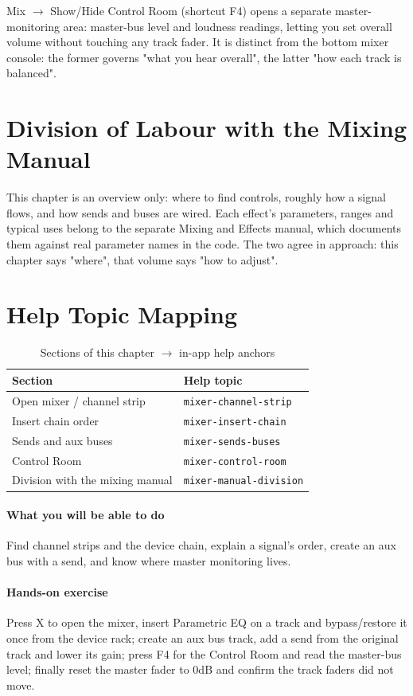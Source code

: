 Mix $\to$ Show/Hide Control Room (shortcut F4) opens a separate master-monitoring
area: master-bus level and loudness readings, letting you set overall volume without
touching any track fader. It is distinct from the bottom mixer console: the former
governs "what you hear overall", the latter "how each track is balanced".


\section{Division of Labour with the Mixing Manual}

This chapter is an overview only: where to find controls, roughly how a signal flows,
and how sends and buses are wired. Each effect's parameters, ranges and typical uses
belong to the separate Mixing and Effects manual, which documents them against real
parameter names in the code. The two agree in approach: this chapter says "where",
that volume says "how to adjust".

\section{Help Topic Mapping}

\begin{table}[htbp]
\centering
\caption{Sections of this chapter $\to$ in-app help anchors}
\label{tab:ch07-help}
\begin{tabular}{ll}
\hline
Section & Help topic \\
\hline
Open mixer / channel strip & \texttt{mixer-channel-strip} \\
Insert chain order & \texttt{mixer-insert-chain} \\
Sends and aux buses & \texttt{mixer-sends-buses} \\
Control Room & \texttt{mixer-control-room} \\
Division with the mixing manual & \texttt{mixer-manual-division} \\
\hline
\end{tabular}
\end{table}

\paragraph{What you will be able to do} Find channel strips and the device chain, explain a signal's order, create an aux bus with a send, and know where master monitoring lives.

\paragraph{Hands-on exercise} Press X to open the mixer, insert Parametric EQ on a track and bypass/restore it once from the device rack; create an aux bus track, add a send from the original track and lower its gain; press F4 for the Control Room and read the master-bus level; finally reset the master fader to 0dB and confirm the track faders did not move.
